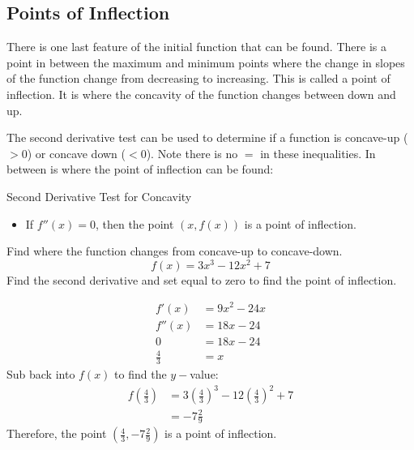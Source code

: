 \subsection*{Points of Inflection}\label{sec:PointsOfInflection}
There is one last feature of the initial function that can be found. There is a point in between the maximum and minimum points where the change in slopes of the function change from decreasing to increasing. This is called a point of inflection. It is where the concavity of the function changes between down and up.
\begin{center}
\end{center}
The second derivative test can be used to determine if a function is concave-up ($>0$) or concave down ($<0$). Note there is no $=$ in these inequalities. In between is where the point of inflection can be found:
\begin{tcolorbox}
	Second Derivative Test for Concavity
	\begin{itemize}
		\item If $f''(x)=0$, then the point $(x,f(x))$ is a point of inflection.\\                         
	\end{itemize}
\end{tcolorbox}

\example Find where the function changes from concave-up to concave-down.\\
\[f(x)=3x^3-12x^2+7\]
\solution Find the second derivative and set equal to zero to find the point of inflection.
\begin{multicols}{2}
\begin{align*}
f'(x)&=9x^2-24x\\
f''(x)&=18x-24\\
0&=18x-24\\
\frac{4}{3}&=x
\end{align*}
Sub back into $f(x)$ to find the $y-$value:\\
\begin{align*}
f\left(\frac{4}{3}\right)&=3\left(\frac{4}{3}\right)^3-12\left(\frac{4}{3}\right)^2+7\\
&=-7\tfrac{2}{9}
\end{align*}
Therefore, the point $\left(\tfrac{4}{3},-7\frac{2}{9}\right)$ is a point of inflection.
\end{multicols}

